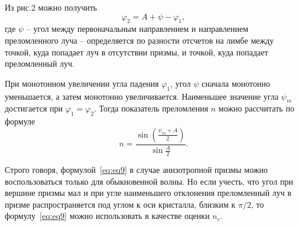 \documentclass[12pt]{article}
\begin{document}
    Из рис.2 можно получить
    \begin{equation}
        \varphi_2 = A + \psi - \varphi_1,
        \label{eq:eq8}
    \end{equation}
    где $\psi$ -- угол между первоначальным направлением и направлением преломленного луча --
    определяется по разности отсчетов на лимбе между точкой, куда попадает луч в отсутствии призмы,
    и точкой, куда попадает преломленный луч.

    При монотонном увеличении угла падения $\varphi_1$, угол $\psi$ сначала монотонно уменьшается,
    а затем монотонно увеличивается.
    Наименьшее значение угла $\psi_m$ достигается при $\varphi_1 = \varphi_2$.
    Тогда показатель преломления $n$ можно рассчитать по формуле
    \begin{equation}
        \label{eq:eq9}
        n = \frac{\sin{\left(\frac{\psi_m + A}{2}\right)}}{\sin{\frac{A}{2}}}.
    \end{equation}

    Строго говоря, формулой\ \eqref{eq:eq9} в случае анизотропной призмы можно воспользоваться
    только для обыкновенной волны.
    Но если учесть, что угол при вершине призмы мал и при угле наименьшего отклонения преломленный луч
    в призме распространяется под углом к оси кристалла, близким к $\pi/2$, то формулу\ \eqref{eq:eq9}
    можно использовать в качестве оценки $n_e$.
\end{document}
